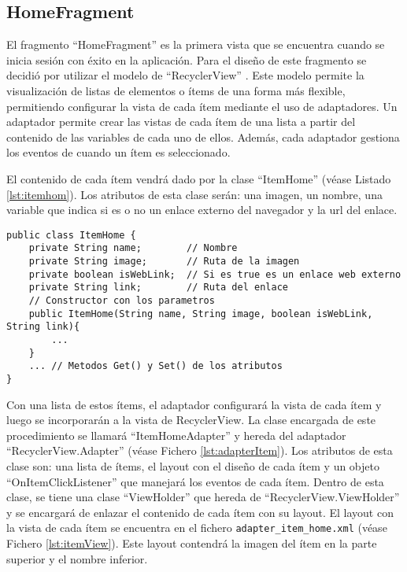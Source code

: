 \subsection{HomeFragment}

El fragmento ``HomeFragment'' es la primera vista que se encuentra cuando se inicia sesión con éxito en la aplicación. Para el diseño de este fragmento se decidió por utilizar el modelo de ``RecyclerView'' \cite{URL::recycler}. Este modelo permite la visualización de listas de elementos o ítems de una forma más flexible, permitiendo configurar la vista de cada ítem mediante el uso de adaptadores. Un adaptador permite crear las vistas de cada ítem de una lista a partir del contenido de las variables de cada uno de ellos. Además, cada adaptador gestiona los eventos de cuando un ítem es seleccionado.

El contenido de cada ítem vendrá dado por la clase ``ItemHome'' (véase Listado \ref{lst:itemhom}). Los atributos de esta clase serán: una imagen, un nombre, una variable que indica si es o no un enlace externo del navegador y la url del enlace.

\begin{lstlisting}[caption={Fichero \texttt{ItemHome.java}, clase de que contendrá  el contenido de cada ítem de la ventana de \textit{Inicio}.},  label={lst:itemhom}]
public class ItemHome {
    private String name;        // Nombre
    private String image;       // Ruta de la imagen
    private boolean isWebLink;  // Si es true es un enlace web externo
    private String link;        // Ruta del enlace
    // Constructor con los parametros
    public ItemHome(String name, String image, boolean isWebLink, String link){
        ...
    }
    ... // Metodos Get() y Set() de los atributos
}
\end{lstlisting}

Con una lista de estos ítems, el adaptador configurará la vista de cada ítem y luego se incorporarán a la vista de RecyclerView. La clase encargada de este procedimiento se llamará ``ItemHomeAdapter'' y hereda del adaptador ``RecyclerView.Adapter'' (véase Fichero \ref{lst:adapterItem}). Los atributos de esta clase son: una lista de ítems, el layout con el diseño de cada ítem y un objeto ``OnItemClickListener'' que manejará los eventos de cada ítem. Dentro de esta clase, se tiene una clase ``ViewHolder'' que hereda de ``RecyclerView.ViewHolder'' y se encargará de enlazar el contenido de cada ítem con su layout. El layout con la vista de cada ítem se encuentra en el fichero \texttt{adapter\_item\_home.xml} (véase Fichero \ref{lst:itemView}). Este layout contendrá la imagen del ítem en la parte superior y el nombre inferior.
     
